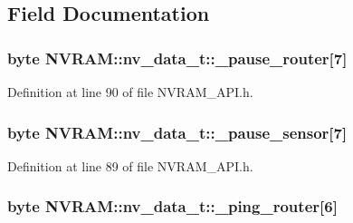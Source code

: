 \subsection{Field Documentation}
\hypertarget{struct_n_v_r_a_m_1_1nv__data__t_ad6bf29fb500a89c614653a1070706dbd}{
\subsubsection[{\-\_\-pause\-\_\-router}]{\setlength{\rightskip}{0pt plus 5cm}byte N\-V\-R\-A\-M\-::nv\-\_\-data\-\_\-t\-::\-\_\-pause\-\_\-router\mbox{[}7\mbox{]}}}\label{struct_n_v_r_a_m_1_1nv__data__t_ad6bf29fb500a89c614653a1070706dbd}


Definition at line 90 of file N\-V\-R\-A\-M\-\_\-\-A\-P\-I.\-h.

\hypertarget{struct_n_v_r_a_m_1_1nv__data__t_a062721d4f967e5c0a8b346f0268a2c87}{
\subsubsection[{\-\_\-pause\-\_\-sensor}]{\setlength{\rightskip}{0pt plus 5cm}byte N\-V\-R\-A\-M\-::nv\-\_\-data\-\_\-t\-::\-\_\-pause\-\_\-sensor\mbox{[}7\mbox{]}}}\label{struct_n_v_r_a_m_1_1nv__data__t_a062721d4f967e5c0a8b346f0268a2c87}


Definition at line 89 of file N\-V\-R\-A\-M\-\_\-\-A\-P\-I.\-h.

\hypertarget{struct_n_v_r_a_m_1_1nv__data__t_a5bc314391f400619fceb6d810c561487}{
\subsubsection[{\-\_\-ping\-\_\-router}]{\setlength{\rightskip}{0pt plus 5cm}byte N\-V\-R\-A\-M\-::nv\-\_\-data\-\_\-t\-::\-\_\-ping\-\_\-router\mbox{[}6\mbox{]}}}\label{struct_n_v_r_a_m_1_1nv__data__t_a5bc314391f400619fceb6d810c561487}



